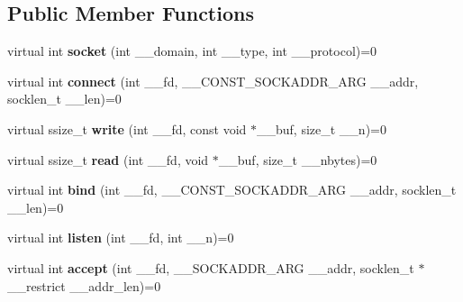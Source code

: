 \subsection*{Public Member Functions}
\begin{DoxyCompactItemize}
\item 
\mbox{\label{classInterfaceBsdSocketFactory_aa259ed6a1bd32e3bf77e97fc150cd54a}} 
virtual int {\bfseries socket} (int \+\_\+\+\_\+domain, int \+\_\+\+\_\+type, int \+\_\+\+\_\+protocol)=0
\item 
\mbox{\label{classInterfaceBsdSocketFactory_a389576ba0564ce79ce650f300921b533}} 
virtual int {\bfseries connect} (int \+\_\+\+\_\+fd, \+\_\+\+\_\+\+C\+O\+N\+S\+T\+\_\+\+S\+O\+C\+K\+A\+D\+D\+R\+\_\+\+A\+RG \+\_\+\+\_\+addr, socklen\+\_\+t \+\_\+\+\_\+len)=0
\item 
\mbox{\label{classInterfaceBsdSocketFactory_a762639f3055ce6e4b21a092f96d6e515}} 
virtual ssize\+\_\+t {\bfseries write} (int \+\_\+\+\_\+fd, const void $\ast$\+\_\+\+\_\+buf, size\+\_\+t \+\_\+\+\_\+n)=0
\item 
\mbox{\label{classInterfaceBsdSocketFactory_a8b2965f642070600bed86e4664beec8b}} 
virtual ssize\+\_\+t {\bfseries read} (int \+\_\+\+\_\+fd, void $\ast$\+\_\+\+\_\+buf, size\+\_\+t \+\_\+\+\_\+nbytes)=0
\item 
\mbox{\label{classInterfaceBsdSocketFactory_a6e38160aac35e1f64b35c205de2f9452}} 
virtual int {\bfseries bind} (int \+\_\+\+\_\+fd, \+\_\+\+\_\+\+C\+O\+N\+S\+T\+\_\+\+S\+O\+C\+K\+A\+D\+D\+R\+\_\+\+A\+RG \+\_\+\+\_\+addr, socklen\+\_\+t \+\_\+\+\_\+len)=0
\item 
\mbox{\label{classInterfaceBsdSocketFactory_a2f2c6dbbb9d1f7fa0a42f0039178836c}} 
virtual int {\bfseries listen} (int \+\_\+\+\_\+fd, int \+\_\+\+\_\+n)=0
\item 
\mbox{\label{classInterfaceBsdSocketFactory_a3be681ec6b076c808a8563daf481c118}} 
virtual int {\bfseries accept} (int \+\_\+\+\_\+fd, \+\_\+\+\_\+\+S\+O\+C\+K\+A\+D\+D\+R\+\_\+\+A\+RG \+\_\+\+\_\+addr, socklen\+\_\+t $\ast$\+\_\+\+\_\+restrict \+\_\+\+\_\+addr\+\_\+len)=0

\end{DoxyCompactItemize}
